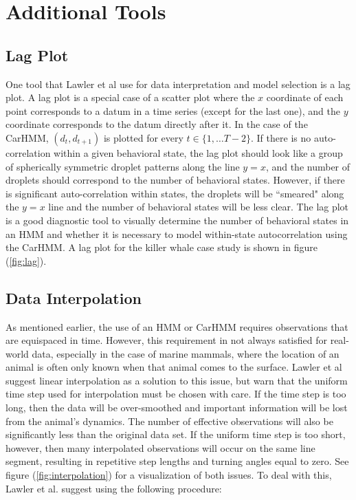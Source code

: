 
\section{Additional Tools}

\subsection{Lag Plot}

One tool that Lawler et al use for data interpretation and model selection is a lag plot. A lag plot is a special case of a scatter plot where the $x$ coordinate of each point corresponds to a datum in a time series (except for the last one), and the $y$ coordinate corresponds to the datum directly after it. In the case of the CarHMM, $(d_t,d_{t+1})$ is plotted for every $t \in \{1, \ldots T-2\}$. If there is no auto-correlation within a given behavioral state, the lag plot should look like a group of spherically symmetric droplet patterns along the line $y=x$, and the number of droplets should correspond to the number of behavioral states. However, if there is significant auto-correlation within states, the droplets will be ``smeared" along the $y=x$ line and the number of behavioral states will be less clear. The lag plot is a good diagnostic tool to visually determine the number of behavioral states in an HMM and whether it is necessary to model within-state autocorrelation using the CarHMM. A lag plot for the killer whale case study is shown in figure (\ref{fig:lag}).

\subsection{Data Interpolation}

As mentioned earlier, the use of an HMM or CarHMM requires observations that are equispaced in time. However, this requirement in not always satisfied for real-world data, especially in the case of marine mammals, where the location of an animal is often only known when that animal comes to the surface. Lawler et al suggest linear interpolation as a solution to this issue, but warn that the uniform time step used for interpolation must be chosen with care. If the time step is too long, then the data will be over-smoothed and important information will be lost from the animal's dynamics. The number of effective observations will also be significantly less than the original data set. If the uniform time step is too short, however, then many interpolated observations will occur on the same line segment, resulting in repetitive step lengths and turning angles equal to zero. See figure (\ref{fig:interpolation}) for a visualization of both issues. To deal with this, Lawler et al. suggest using the following procedure:

